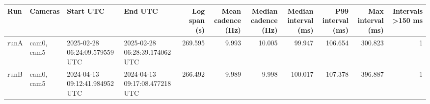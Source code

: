 \begin{tabular}{llllrrrrrrr}
\toprule
Run & Cameras & Start UTC & End UTC & Log span (s) & Mean cadence (Hz) & Median cadence (Hz) & Median interval (ms) & P99 interval (ms) & Max interval (ms) & Intervals >150 ms \\
\midrule
runA & cam0, cam5 & 2025-02-28 06:24:09.579559 UTC & 2025-02-28 06:28:39.174062 UTC & 269.595 & 9.993 & 10.005 & 99.947 & 106.654 & 300.823 & 1 \\
runB & cam0, cam5 & 2024-04-13 09:12:41.984952 UTC & 2024-04-13 09:17:08.477218 UTC & 266.492 & 9.989 & 9.998 & 100.017 & 107.378 & 396.887 & 1 \\
\bottomrule
\end{tabular}
